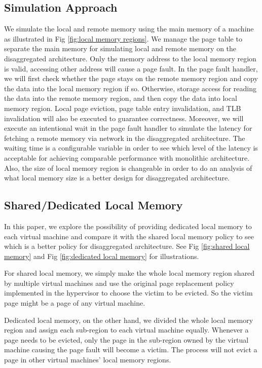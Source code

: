 \documentclass[twocolumn]{article}
\begin{document}
\subsection{Simulation Approach}
We simulate the local and remote memory using the main memory of a machine as illustrated in Fig \ref{fig:local memory regions}. We manage the page table to separate the main memory for simulating local and remote memory on the disaggregated architecture. Only the memory address to the local memory region is valid, accessing other address will cause a page fault. In the page fault handler, we will first check whether the page stays on the remote memory region and copy the data into the local memory region if so. Otherwise, storage access for reading the data into the remote memory region, and then copy the data into local memory region. Local page eviction, page table entry invalidation, and TLB invalidation will also be executed to guarantee correctness. Moreover, we will execute an intentional wait in the page fault handler to simulate the latency for fetching a remote memory via network in the disaggregated architecture. The waiting time is a configurable variable in order to see which level of the latency is acceptable for achieving comparable performance with monolithic architecture. Also, the size of local memory region is changeable in order to do an analysis of what local memory size is a better design for disaggregated architecture.

\subsection{Shared/Dedicated Local Memory}
In this paper, we explore the possibility of providing dedicated local memory to each virtual machine and compare it with the shared local memory policy to see which is a better policy for disaggregated architecture. See Fig \ref{fig:shared local memory} and Fig \ref{fig:dedicated local memory} for illustrations.

For shared local memory, we simply make the whole local memory region shared by multiple virtual machines and use the original page replacement policy implemented in the hypervisor to choose the victim to be evicted. So the victim page might be a page of any virtual machine.

Dedicated local memory, on the other hand, we divided the whole local memory region and assign each sub-region to each virtual machine equally. Whenever a page needs to be evicted, only the page in the sub-region owned by the virtual machine causing the page fault will become a victim. The process will not evict a page in other virtual machines' local memory regions.
\end{document}
